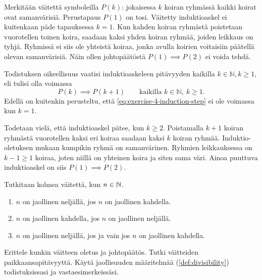 \documentclass[12pt,a4paper]{article}
\begin{document}
\begin{solution}
  Merkitään väitettä symboleilla \(P(k)\): jokaisessa \(k\) koiran ryhmässä
  kaikki koirat ovat samanvärisiä. Perustapaus \(P(1)\) on tosi. Väitetty
  induktioaskel ei kuitenkaan päde tapauksessa \(k = 1\). Kun kahden koiran
  ryhmästä poistetaan vuorotellen toinen koira, saadaan kaksi yhden koiran
  ryhmää, joiden leikkaus on tyhjä. Ryhmissä ei siis ole yhteistä koiraa,
  jonka avulla koirien voitaisiin päätellä olevan samanvärisiä. Näin ollen
  johtopäätöstä \(P(1) \implies P(2)\) ei voida tehdä.

  Todistuksen oikeellisuus vaatisi induktioaskeleen pitävyyden kaikilla
  \(k \in \mathbb{N}, k \geq 1\), eli tulisi olla voimassa
  \begin{equation}\label{eq:exercise-4-induction-step}
    P(k) \implies P(k + 1)
    \qquad \text{kaikilla } k \in \mathbb{N},\ k \geq 1.
  \end{equation}
  Edellä on kuitenkin perusteltu, että \eqref{eq:exercise-4-induction-step} ei
  ole voimassa kun \(k = 1\).

  Todetaan vielä, että induktioaskel pätee, kun \(k \geq 2\).
  Poistamalla \(k + 1\) koiran ryhmästä vuorotellen kaksi eri koiraa saadaan
  kaksi \(k\) koiran ryhmää. Induktio-oletuksen mukaan kumpikin ryhmä on
  samanvärinen. Ryhmien leikkauksessa on \(k - 1 \geq 1\) koiraa, joten niillä
  on yhteinen koira ja siten sama väri. Ainoa puuttuva induktioaskel on siis
  \(P(1) \implies P(2)\).
\end{solution}

\begin{exercise}
  Tutkitaan kolmea väitettä, kun \(n \in \mathbb{N}\).
  \begin{enumerate}[label=(\arabic*), nosep]
    \item \(n\) on jaollinen neljällä, jos \(n\) on jaollinen kahdella.
    \item \(n\) on jaollinen kahdella, jos \(n\) on jaollinen neljällä.
    \item \(n\) on jaollinen neljällä, jos ja vain jos \(n\) on
      jaollinen kahdella.
  \end{enumerate}
  Erittele kunkin väitteen oletus ja johtopäätös. Tutki väitteiden
  paikkaansapitävyyttä.
  Käytä jaollisuuden määritelmää (\ref{def:divisibility})
  todistuksissasi ja vastaesimerkeissäsi.
\end{exercise}
\end{document}
